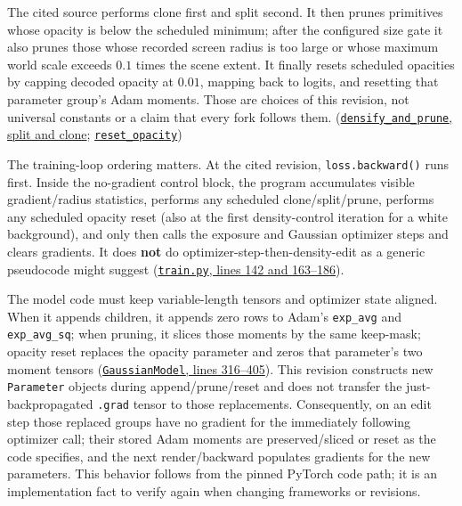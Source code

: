 The cited source performs clone first and split second. It then prunes primitives whose opacity is below the scheduled minimum; after the configured size gate it also prunes those whose recorded screen radius is too large or whose maximum world scale exceeds \(0.1\) times the scene extent. It finally resets scheduled opacities by capping decoded opacity at \(0.01\), mapping back to logits, and resetting that parameter group's Adam moments. Those are choices of this revision, not universal constants or a claim that every fork follows them. (\href{https://github.com/graphdeco-inria/gaussian-splatting/blob/54c035f7834b564019656c3e3fcc3646292f727d/scene/gaussian_model.py\#L409-L472}{\texttt{densify\_and\_prune}, split and clone}; \href{https://github.com/graphdeco-inria/gaussian-splatting/blob/54c035f7834b564019656c3e3fcc3646292f727d/scene/gaussian_model.py\#L258-L261}{\texttt{reset\_opacity}})

The training-loop ordering matters. At the cited revision, \texttt{loss.backward()} runs first. Inside the no-gradient control block, the program accumulates visible gradient/radius statistics, performs any scheduled clone/split/prune, performs any scheduled opacity reset (also at the first density-control iteration for a white background), and only then calls the exposure and Gaussian optimizer steps and clears gradients. It does \textbf{not} do optimizer-step-then-density-edit as a generic pseudocode might suggest (\href{https://github.com/graphdeco-inria/gaussian-splatting/blob/54c035f7834b564019656c3e3fcc3646292f727d/train.py\#L142-L186}{\texttt{train.py}, lines 142 and 163--186}).

The model code must keep variable-length tensors and optimizer state aligned. When it appends children, it appends zero rows to Adam's \texttt{exp\_avg} and \texttt{exp\_avg\_sq}; when pruning, it slices those moments by the same keep-mask; opacity reset replaces the opacity parameter and zeros that parameter's two moment tensors (\href{https://github.com/graphdeco-inria/gaussian-splatting/blob/54c035f7834b564019656c3e3fcc3646292f727d/scene/gaussian_model.py\#L316-L405}{\texttt{GaussianModel}, lines 316--405}). This revision constructs new \texttt{Parameter} objects during append/prune/reset and does not transfer the just-backpropagated \texttt{.grad} tensor to those replacements. Consequently, on an edit step those replaced groups have no gradient for the immediately following optimizer call; their stored Adam moments are preserved/sliced or reset as the code specifies, and the next render/backward populates gradients for the new parameters. This behavior follows from the pinned PyTorch code path; it is an implementation fact to verify again when changing frameworks or revisions.


